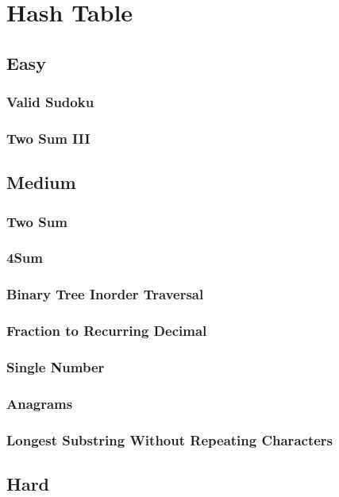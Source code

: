 \documentclass[12pt]{book}
\begin{document}
\chapter{Hash Table}
\label{sec-6}
\section{Easy}
\label{sec-6-1}
\subsection{Valid Sudoku}
\label{sec-6-1-1}
\subsection{Two Sum III}
\label{sec-6-1-2}
\section{Medium}
\label{sec-6-2}
\subsection{Two Sum}
\label{sec-6-2-1}
\subsection{4Sum}
\label{sec-6-2-2}
\subsection{Binary Tree Inorder Traversal}
\label{sec-6-2-3}
\subsection{Fraction to Recurring Decimal}
\label{sec-6-2-4}
\subsection{Single Number}
\label{sec-6-2-5}
\subsection{Anagrams}
\label{sec-6-2-6}
\subsection{Longest Substring Without Repeating Characters}
\label{sec-6-2-7}
\section{Hard}
\label{sec-6-3}
\end{document}
